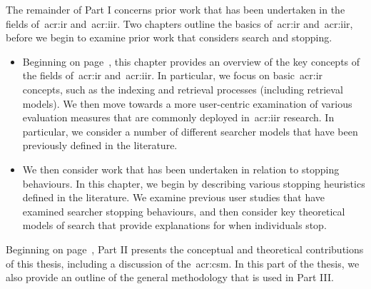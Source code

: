 \noindent
{}
The remainder of Part I concerns prior work that has been undertaken in the fields of~\gls{acr:ir} and~\gls{acr:iir}. Two chapters outline the basics of~\gls{acr:ir} and~\gls{acr:iir}, before we begin to examine prior work that considers search and stopping.

\begin{itemize}
    \item[]{} Beginning on page~\pageref{chap:ir_background}, this chapter provides an overview of the key concepts of the fields of~\gls{acr:ir} and~\gls{acr:iir}. In particular, we focus on basic~\gls{acr:ir} concepts, such as the indexing and retrieval processes (including retrieval models). We then move towards a more user-centric examination of various evaluation measures that are commonly deployed in~\gls{acr:iir} research. In particular, we consider a number of different searcher models that have been previously defined in the literature.
    
    \item[]{} We then consider work that has been undertaken in relation to stopping behaviours. In this chapter, we begin by describing various stopping heuristics defined in the literature. We examine previous user studies that have examined searcher stopping behaviours, and then consider key theoretical models of search that provide explanations for when individuals stop.
\end{itemize}

\noindent
{} Beginning on page~\pageref{part:stopping}, Part II presents the conceptual and theoretical contributions of this thesis, including a discussion of the~\gls{acr:csm}. In this part of the thesis, we also provide an outline of the general methodology that is used in Part III.


